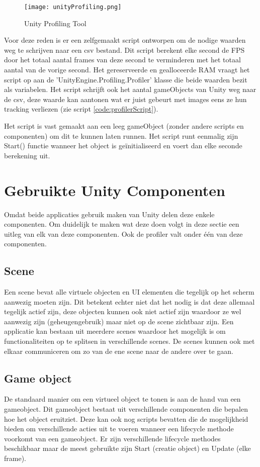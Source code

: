 \begin{figure}
    \texttt{[image: unityProfiling.png]}
    \caption{Unity Profiling Tool}
    \label{fig:unityprofiling}
\end{figure}

Voor deze reden is er een zelfgemaakt script ontworpen om de nodige waarden weg te schrijven naar een csv bestand. Dit script berekent elke second de FPS door het totaal aantal frames van deze second te verminderen met het totaal aantal van de vorige second. Het gereserveerde en gealloceerde RAM vraagt het script op aan de 'UnityEngine.Profiling.Profiler' klasse die beide waarden bezit als variabelen. Het script schrijft ook het aantal gameObjects van Unity weg naar de csv, deze waarde kan aantonen wat er juist gebeurt met images eens ze hun tracking verliezen (zie script \ref{code:profilerScript}).

Het script is vast gemaakt aan een leeg gameObject (zonder andere scripts en componenten) om dit te kunnen laten runnen. Het script runt eenmalig zijn Start() functie wanneer het object is geïnitialiseerd en voert dan elke seconde berekening uit.


\section{Gebruikte Unity Componenten}
Omdat beide applicaties gebruik maken van Unity delen deze enkele componenten. Om duidelijk te maken wat deze doen volgt in deze sectie een uitleg van elk van deze componenten. Ook de profiler valt onder één van deze componenten.

\subsection{Scene}
Een scene bevat alle virtuele objecten en  UI elementen die tegelijk op het scherm aanwezig moeten zijn. Dit betekent echter niet dat het nodig is dat deze allemaal tegelijk actief zijn, deze objecten kunnen ook niet actief zijn waardoor ze wel aanwezig zijn (geheugengebruik) maar niet op de scene zichtbaar zijn. Een applicatie kan bestaan uit meerdere scenes waardoor het mogelijk is om functionaliteiten op te splitsen in verschillende scenes. De scenes kunnen ook met elkaar communiceren om zo van de ene scene naar de andere over te gaan.

\subsection{Game object}
De standaard manier om een virtueel object te tonen is aan de hand van een gameobject. Dit gameobject bestaat uit verschillende componenten die bepalen hoe het object eruitziet. Deze kan ook nog scripts bevatten die de mogelijkheid bieden om verschillende acties uit te voeren wanneer een lifecycle methode voorkomt van een gameobject. Er zijn verschillende lifecycle methodes beschikbaar maar de meest gebruikte zijn Start (creatie object) en Update (elke frame).

